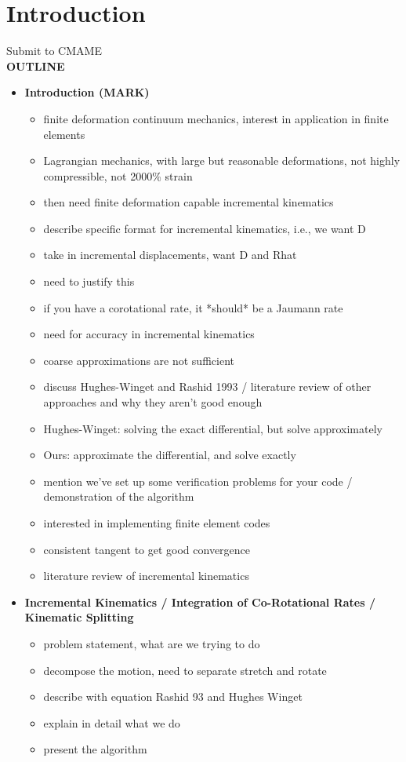 \section{Introduction}

Submit to CMAME \\


{\bf OUTLINE} \\

\begin{itemize}
\item {\bf Introduction (MARK)}
\begin{itemize}
\item finite deformation continuum mechanics, interest in application in finite elements
\item Lagrangian mechanics, with large but reasonable deformations, not highly compressible, not 2000\% strain
\item then need finite deformation capable incremental kinematics
\item describe specific format for incremental kinematics, i.e., we want D
\item take in incremental displacements, want D and Rhat
\item need to justify this
\item if you have a corotational rate, it *should* be a Jaumann rate
\item need for accuracy in incremental kinematics
\item coarse approximations are not sufficient
\item discuss Hughes-Winget and Rashid 1993 / literature review of other approaches and why they aren't good enough
\item Hughes-Winget: solving the exact differential, but solve approximately
\item Ours: approximate the differential, and solve exactly
\item mention we've set up some verification problems for your code / demonstration of the algorithm
\item interested in implementing finite element codes
\item consistent tangent to get good convergence
\item literature review of incremental kinematics
\end{itemize}

\item {\bf Incremental Kinematics / Integration of Co-Rotational Rates / Kinematic Splitting}
\begin{itemize}
\item problem statement, what are we trying to do
\item decompose the motion, need to separate stretch and rotate
\item describe with equation Rashid 93 and Hughes Winget
\item explain in detail what we do
\item present the algorithm
\end{itemize}


\end{itemize}
